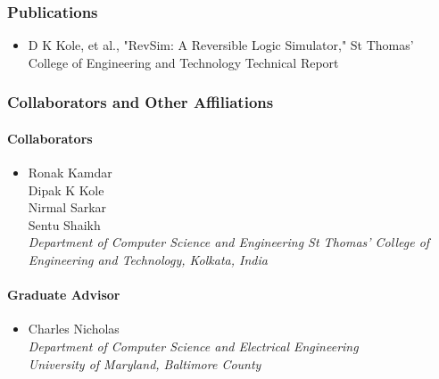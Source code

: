     \subsubsection{Publications}
      \begin{itemize}
        \item D K Kole, et al., "RevSim: A Reversible Logic Simulator," St
        Thomas' College of Engineering and Technology Technical Report
      \end{itemize}
    \subsubsection{Collaborators and Other Affiliations}
      \paragraph{Collaborators}
	\begin{itemize}
          \item Ronak Kamdar\\
            Dipak K Kole\\
            Nirmal Sarkar\\
            Sentu Shaikh\\
            \textit{Department of Computer Science and Engineering
              St Thomas' College of Engineering and Technology, Kolkata, India}
        \end{itemize}
      \paragraph{Graduate Advisor}
	\begin{itemize}
          \item Charles Nicholas\\
            \textit{Department of Computer Science and Electrical Engineering\\
              University of Maryland, Baltimore County}
        \end{itemize}
